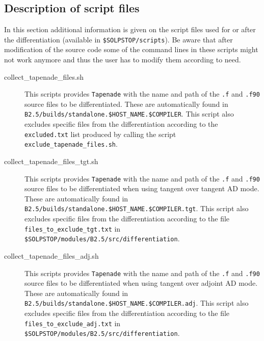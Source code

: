 \subsection{Description of script files}\label{sec:script_ad}

\begin{sloppypar}
In this section additional information is given on the script files used for or after the differentiation (available in {\tt \$SOLPSTOP/scripts}). Be aware that after modification of the source code some of the command lines in these scripts might not work anymore and thus the user has to modify them according to need.
\begin{description}
  \item[collect\_tapenade\_files.sh] This scripts provides {\tt Tapenade} with the name and path of the {\tt *.f} and {\tt *.f90} source files to be differentiated. These are automatically found in {\tt B2.5/builds/standalone.\$HOST\_NAME.\allowbreak\$COMPILER}. This script also excludes specific files from the differentiation according to the {\tt excluded.txt} list produced by calling the script {\tt exclude\_tapenade\_files.sh}.

  \item[collect\_tapenade\_files\_tgt.sh] This scripts provides {\tt Tapenade} with the name and path of the {\tt *.f} and {\tt *.f90} source files to be differentiated when using tangent over tangent AD mode. These are automatically found in {\tt B2.5/builds/standalone.\$HOST\_NAME.\allowbreak\$COMPILER.tgt}. This script also excludes specific files from the differentiation according to the file {\tt files\_to\_exclude\_tgt.txt} in {\tt \$SOLPSTOP/modules/B2.5/src/differentiation}.

  \item[collect\_tapenade\_files\_adj.sh] This scripts provides {\tt Tapenade} with the name and path of the {\tt *.f} and {\tt *.f90} source files to be differentiated when using tangent over adjoint AD mode. These are automatically found in {\tt B2.5/builds/standalone.\$HOST\_NAME.\allowbreak\$COMPILER.adj}. This script also excludes specific files from the differentiation according to the file {\tt files\_to\_exclude\_adj.txt} in {\tt \$SOLPSTOP/modules/B2.5/src/differentiation}.


\end{description}
\end{sloppypar}
